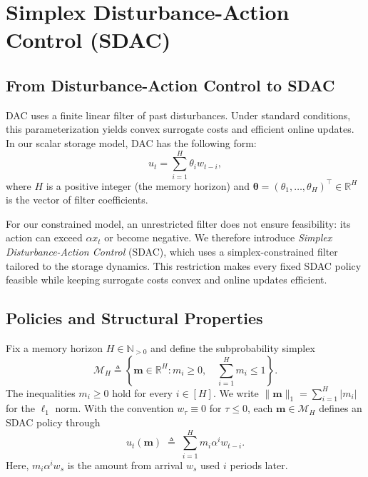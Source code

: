 \documentclass[journal]{IEEEtran}
\theoremstyle{remark}
\begin{document}
\section{Simplex Disturbance-Action Control (SDAC)}
\label{sec:sdac}

\subsection{From Disturbance-Action Control to SDAC}
DAC uses a finite linear filter of past disturbances. Under standard conditions, this
parameterization yields convex surrogate costs and efficient online updates. In
our scalar storage model, DAC has the following form:
\begin{equation}
\label{eq:dac-param}
u_t = \sum_{i=1}^{H} \theta_i w_{t-i},
\end{equation}
where $H$ is a positive integer (the memory horizon) and
$\boldsymbol{\theta}=(\theta_1,\ldots,\theta_H)^\top\in\mathbb{R}^H$ is the vector
of filter coefficients.

For our constrained model, an unrestricted filter does not ensure feasibility: its
action can exceed $\alpha x_t$ or become negative.
We therefore introduce \emph{Simplex Disturbance-Action Control} (SDAC), which uses a
simplex-constrained filter tailored to the storage dynamics. This restriction makes
every fixed SDAC policy feasible while keeping surrogate costs convex and online
updates efficient.


\subsection{Policies and Structural Properties}
Fix a memory horizon $H\in\mathbb{N}_{>0}$ and define the subprobability simplex
\begin{equation}
\label{eq:def-simplex}
\mathcal{M}_H
\triangleq
\left\{
\mathbf{m}\in\mathbb{R}^H:
m_i\ge0,\quad
\sum_{i=1}^H m_i\le1
\right\}.
\end{equation}
The inequalities $m_i\ge0$ hold for every $i\in[H]$.
We write $\|\mathbf{m}\|_1=\sum_{i=1}^H|m_i|$ for the $\ell_1$ norm.
With the convention $w_\tau\equiv0$ for $\tau\le0$, each
$\mathbf{m}\in\mathcal{M}_H$ defines an SDAC policy through
\begin{equation}
\label{eq:def-sdac-policy}
u_t(\mathbf{m})
\;\triangleq\;
\sum_{i=1}^{H} m_i\alpha^i w_{t-i}.
\end{equation}
Here, $m_i\alpha^i w_s$ is the amount from arrival $w_s$ used $i$ periods later.
\end{document}
